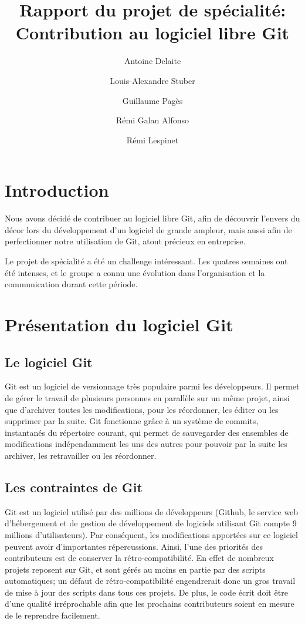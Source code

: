 \documentclass[a4paper, 12pt]{article}
\title{Rapport du projet de spécialité:\\ Contribution au logiciel libre Git}
\author{Antoine Delaite \and Louis-Alexandre Stuber \and Guillaume Pagès \and Rémi Galan Alfonso \and Rémi Lespinet}
\date{}
\begin{document}
\maketitle

\section{Introduction}

Nous avons décidé de contribuer au logiciel libre Git, afin de découvrir l'envers du décor lors du développement d'un logiciel de grande ampleur, mais aussi afin de perfectionner notre utilisation de Git, atout précieux en entreprise.

Le projet de spécialité a été un challenge intéressant. Les quatres semaines ont été intenses, et le groupe a connu une évolution dans l'organisation et la communication durant cette période.


\section{Présentation du logiciel Git}

\subsection{Le logiciel Git}

Git est un logiciel de versionnage très populaire parmi les développeurs.
Il permet de gérer le travail de plusieurs personnes en parallèle sur un même projet, ainsi que d'archiver toutes les modifications, pour les réordonner, les éditer ou les supprimer par la suite.
Git fonctionne grâce à un système de commits, instantanés du répertoire courant, qui permet de sauvegarder des ensembles de modifications indépendamment les uns des autres pour pouvoir par la suite les archiver, les retravailler ou les réordonner.

\subsection{Les contraintes de Git}

Git est un logiciel utilisé par des millions de développeurs (Github, le service web d'hébergement et de gestion de développement de logiciels utilisant Git compte 9 millions d'utilisateurs).
Par conséquent, les modifications apportées sur ce logiciel peuvent avoir d'importantes répercussions.
Ainsi, l'une des priorités des contributeurs est de conserver la rétro-compatibilité.
En effet de nombreux projets reposent sur Git, et sont gérés au moins en partie par des scripts automatiques; un défaut de rétro-compatibilité engendrerait donc un gros travail de mise à jour des scripts dans tous ces projets. 
De plus, le code écrit doit être d'une qualité irréprochable afin que les prochains contributeurs soient en mesure de le reprendre facilement.
\end{document}
